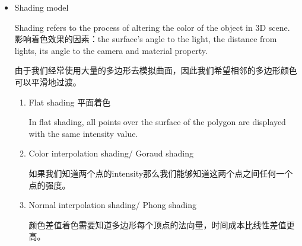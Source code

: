 \documentclass[UTF8]{ctexart}
\begin{document}
\begin{itemize}
\begin{itemize}
        \item Spectrum reflection 镜面反射
        
        Spectrum reflection occurs on when light falls on shiny surface.

        Phone Model

        $I=I_p cos^n(a) W(\theta)$
        \begin{enumerate}
            \item n 是specular-reflection exponent
            \item a 是观测者视线与反射光线的夹角
            \item $W(\theta)$是镜面反射系数
        \end{enumerate}

        \item Ambient环境光
        
        Ambient is non-directional light source and not affected by anything in the world.

        $I=I_a K_a$
        \begin{enumerate}
            \item $I_a$是环境光强度
            \item $K_a$是环境光反射系数
        \end{enumerate}

    \end{itemize}

    \item Shading model
    
    Shading refers to the process of altering the color of the object in 3D scene.
    影响着色效果的因素：the surface's angle to the light, the distance from lights, its angle to the camera and material property.

    由于我们经常使用大量的多边形去模拟曲面，因此我们希望相邻的多边形颜色可以平滑地过渡。
    \begin{enumerate}
        \item Flat shading 平面着色
        
        In flat shading, all points over the surface of the polygon are displayed with the same intensity value.

        \item Color interpolation shading/ Goraud shading

        如果我们知道两个点的intensity那么我们能够知道这两个点之间任何一个点的强度。

        \item Normal interpolation shading/ Phong shading
        
        颜色差值着色需要知道多边形每个顶点的法向量，时间成本比线性差值更高。

    \end{enumerate}

\end{itemize}
\end{document}

